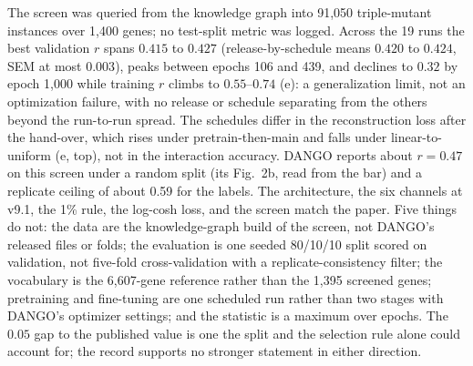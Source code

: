  The screen was queried from the knowledge graph
into 91,050 triple-mutant instances over 1,400 genes; no test-split metric was logged. Across
the 19 runs the best validation $r$ spans $0.415$ to $0.427$ (release-by-schedule means
$0.420$ to $0.424$, SEM at most $0.003$), peaks between epochs 106 and 439, and declines to
$0.32$ by epoch 1,000 while training $r$ climbs to $0.55$--$0.74$ (e):
a generalization limit, not an optimization failure, with no release or schedule separating
from the others beyond the run-to-run spread. The schedules differ in the reconstruction
loss after the hand-over, which rises under pretrain-then-main and falls under
linear-to-uniform (e, top), not in the interaction accuracy. DANGO
reports about $r=0.47$ on this screen
under a random split (its Fig.~2b, read from the bar) and a replicate ceiling of about 0.59
for the labels. The architecture, the six channels at v9.1, the 1\% rule, the log-cosh loss,
and the screen match the paper. Five things do not: the data are the knowledge-graph build of
the screen, not DANGO's released files or folds; the evaluation is one seeded 80/10/10 split
scored on validation, not five-fold cross-validation with a replicate-consistency filter; the
vocabulary is the 6,607-gene reference rather than the 1,395 screened genes; pretraining and
fine-tuning are one scheduled run rather than two stages with DANGO's optimizer settings; and
the statistic is a maximum over epochs. The $0.05$ gap to the published value is one the
split and the selection rule alone could account for; the record supports no stronger
statement in either direction.

